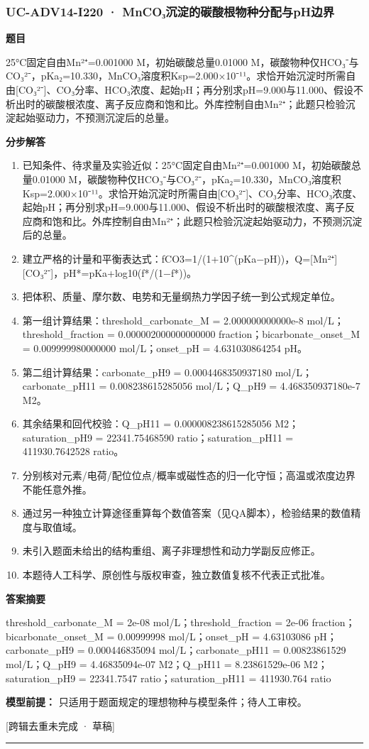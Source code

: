 \documentclass[UTF8,11pt,a4paper]{ctexart}
\begin{document}
\subsubsection*{UC-ADV14-I220 · MnCO₃沉淀的碳酸根物种分配与pH边界}
\noindent\textbf{题目}\par
25°C固定自由Mn²⁺=0.001000 M，初始碳酸总量0.01000 M，碳酸物种仅HCO₃⁻与CO₃²⁻，pKa₂=10.330，MnCO₃溶度积Ksp=2.000×10⁻¹¹。求恰开始沉淀时所需自由[CO₃²⁻]、CO₃分率、HCO₃浓度、起始pH；再分别求pH=9.000与11.000、假设不析出时的碳酸根浓度、离子反应商和饱和比。外库控制自由Mn²⁺；此题只检验沉淀起始驱动力，不预测沉淀后的总量。\par
\medskip\noindent\textbf{分步解答}
\begin{enumerate}
\item 已知条件、待求量及实验近似：25°C固定自由Mn²⁺=0.001000 M，初始碳酸总量0.01000 M，碳酸物种仅HCO₃⁻与CO₃²⁻，pKa₂=10.330，MnCO₃溶度积Ksp=2.000×10⁻¹¹。求恰开始沉淀时所需自由[CO₃²⁻]、CO₃分率、HCO₃浓度、起始pH；再分别求pH=9.000与11.000、假设不析出时的碳酸根浓度、离子反应商和饱和比。外库控制自由Mn²⁺；此题只检验沉淀起始驱动力，不预测沉淀后的总量。
\item 建立严格的计量和平衡表达式：fCO3=1/(1+10\textasciicircum{}(pKa−pH))，Q=[Mn²⁺][CO₃²⁻]，pH*=pKa+log10(f*/(1−f*))。
\item 把体积、质量、摩尔数、电势和无量纲热力学因子统一到公式规定单位。
\item 第一组计算结果：threshold\_carbonate\_M = 2.000000000000e-8 mol/L；threshold\_fraction = 0.000002000000000000 fraction；bicarbonate\_onset\_M = 0.009999980000000 mol/L；onset\_pH = 4.631030864254 pH。
\item 第二组计算结果：carbonate\_pH9 = 0.0004468350937180 mol/L；carbonate\_pH11 = 0.008238615285056 mol/L；Q\_pH9 = 4.468350937180e-7 M2。
\item 其余结果和回代校验：Q\_pH11 = 0.000008238615285056 M2；saturation\_pH9 = 22341.75468590 ratio；saturation\_pH11 = 411930.7642528 ratio。
\item 分别核对元素/电荷/配位位点/概率或磁性态的归一化守恒；高温或浓度边界不能任意外推。
\item 通过另一种独立计算途径重算每个数值答案（见QA脚本），检验结果的数值精度与取值域。
\item 未引入题面未给出的结构重组、离子非理想性和动力学副反应修正。
\item 本题待人工科学、原创性与版权审查，独立数值复核不代表正式批准。
\end{enumerate}
\noindent\textbf{答案摘要}\par
threshold\_carbonate\_M = 2e-08 mol/L；threshold\_fraction = 2e-06 fraction；bicarbonate\_onset\_M = 0.00999998 mol/L；onset\_pH = 4.63103086 pH；carbonate\_pH9 = 0.000446835094 mol/L；carbonate\_pH11 = 0.00823861529 mol/L；Q\_pH9 = 4.46835094e-07 M2；Q\_pH11 = 8.23861529e-06 M2；saturation\_pH9 = 22341.7547 ratio；saturation\_pH11 = 411930.764 ratio\par
\noindent\textbf{模型前提：}
只适用于题面规定的理想物种与模型条件；待人工审校。\par
\noindent\textcolor{red!65!black}{[跨辑去重未完成 · 草稿]} \par
\medskip\hrule\medskip
{}
\end{document}
